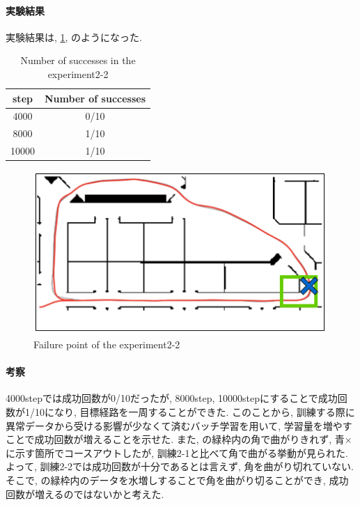\paragraph{実験結果}
実験結果は, \ref{tb:exp3}, のようになった.

\begin{table}[h]
  \centering
  \begin{tabular}{|c|c|} \hline
    step & Number of successes \\ \hline
    4000 & 0/10 \\ \hline
    8000 & 1/10 \\ \hline
    10000 & 1/10 \\ \hline
  \end{tabular}
  \caption{Number of successes in the experiment2-2}
  \label{tb:exp3}
\end{table}

\begin{figure}[h]
  \centering
  \includegraphics[keepaspectratio, scale=0.6]{images/result3.png}
  \caption{Failure point of the experiment2-2}
  \label{Fig:result3}
  \end{figure}

\paragraph{考察}
4000stepでは成功回数が0/10だったが, 8000step, 10000stepにすることで成功回数が1/10になり, 目標経路を一周することができた. このことから, 訓練する際に異常データから受ける影響が少なくて済むバッチ学習を用いて, 学習量を増やすことで成功回数が増えることを示せた. また, の緑枠内の角で曲がりきれず, 青×に示す箇所でコースアウトしたが, 訓練2-1と比べて角で曲がる挙動が見られた. よって, 訓練2-2では成功回数が十分であるとは言えず, 角を曲がり切れていない. そこで, の緑枠内のデータを水増しすることで角を曲がり切ることができ, 成功回数が増えるのではないかと考えた. 

